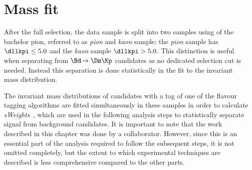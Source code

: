 \chapter{Mass fit}
\label{ch:massfit}

\linespread{1.08}\selectfont

After the full selection, the data sample is split into two samples using \dllkpi of the bachelor pion, referred to as \emph{pion} and \emph{kaon} sample:
the \emph{pion} sample has $\dllkpi\leq5.0$ and the \emph{kaon} sample $\dllkpi>5.0$.
This distinction is useful when separating \mbox{\BdToDpi} from $\Bd\!\to\Dm\Kp$ candidates as no dedicated selection cut is needed.
Instead this separation is done statistically in the fit to the invariant mass distribution.

The invariant \Bz mass distributions of candidates with a tag of one of the flavour tagging algorithms are fitted simultaneously in these samples in order to calculate \emph{sWeights}~\cite{Pivk:2004ty}, which are used in the following analysis steps to statistically separate signal from background candidates.
It is important to note that the work described in this chapter was done by a collaborator.
However, since this is an essential part of the analysis required to follow the subsequent steps, it is not omitted completely, but the extent to which \eg experimental techniques are described is less comprehensive compared to the other parts.

